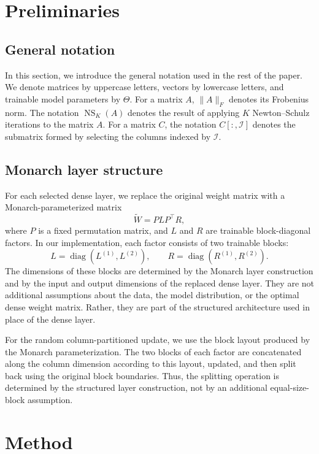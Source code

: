 \documentclass{article}
\begin{document}
\section{Preliminaries}\label{sec:prelim}

\subsection{General notation}

In this section, we introduce the general notation used in the rest of the paper. We denote matrices by uppercase letters, vectors by lowercase letters, and trainable model parameters by \(\Theta\). For a matrix \(A\), \(\|A\|_F\) denotes its Frobenius norm. The notation \(\operatorname{NS}_K(A)\) denotes the result of applying \(K\) Newton--Schulz iterations to the matrix \(A\). For a matrix \(C\), the notation \(C[:,\mathcal{I}]\) denotes the submatrix formed by selecting the columns indexed by \(\mathcal{I}\).

\subsection{Monarch layer structure}

For each selected dense layer, we replace the original weight matrix with a Monarch-parameterized matrix
\[
\widetilde{W} = P L P^\top R,
\]
where \(P\) is a fixed permutation matrix, and \(L\) and \(R\) are trainable block-diagonal factors. In our implementation, each factor consists of two trainable blocks:
\[
L = \operatorname{diag}(L^{(1)}, L^{(2)}),
\qquad
R = \operatorname{diag}(R^{(1)}, R^{(2)}).
\]
The dimensions of these blocks are determined by the Monarch layer construction and by the input and output dimensions of the replaced dense layer. They are not additional assumptions about the data, the model distribution, or the optimal dense weight matrix. Rather, they are part of the structured architecture used in place of the dense layer.

For the random column-partitioned update, we use the block layout produced by the Monarch parameterization. The two blocks of each factor are concatenated along the column dimension according to this layout, updated, and then split back using the original block boundaries. Thus, the splitting operation is determined by the structured layer construction, not by an additional equal-size-block assumption.

\section{Method}\label{sec:method}
\end{document}
